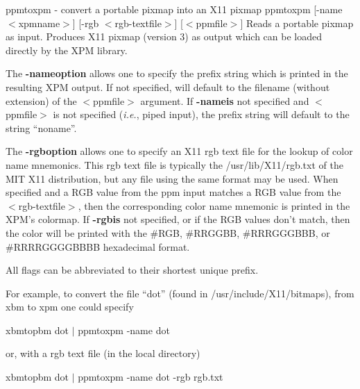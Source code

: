 %

\newpage
%

ppmtoxpm - convert a portable pixmap into an X11 pixmap
ppmtoxpm [-name $<$xpmname$>$] [-rgb $<$rgb-textfile$>$] [$<$ppmfile$>$]
Reads a portable pixmap as input.
Produces X11 pixmap  (version 3) as output which
can be loaded directly by the XPM library.
\par
The {\bf -nameoption} allows one to specify the prefix string which is printed
in the resulting XPM output.  If not specified, will default to the
filename (without extension) of the $<$ppmfile$>$ argument.
If {\bf -nameis} not specified and $<$ppmfile$>$
is not specified ({\it i.e.}, piped input), the prefix string will default to
the string ``noname''.
\par
The {\bf -rgboption} allows one to specify an X11 rgb text file for the
lookup of color name mnemonics.  This rgb text file is typically the
/usr/lib/X11/rgb.txt of the MIT X11 distribution, but any file using the
same format may be used.  When specified and
a RGB value from the ppm input matches a RGB value from the $<$rgb-textfile$>$,
then the corresponding color name mnemonic is printed in the XPM's colormap.
If {\bf -rgbis} not specified, or if the RGB values don't match, then the color
will be printed with the \#RGB, \#RRGGBB, \#RRRGGGBBB, or \#RRRRGGGGBBBB
hexadecimal format.
\par
All flags can be abbreviated to their shortest unique prefix.
\par
For example, to convert the file ``dot'' (found in /usr/include/X11/bitmaps),
from xbm to xpm one could specify
\begin{IPlist}
\IPitem{{}}
xbmtopbm dot $|$ ppmtoxpm -name dot
\end{IPlist}

\par
or, with a rgb text file (in the local directory)
\begin{IPlist}
\IPitem{{}}
xbmtopbm dot $|$ ppmtoxpm -name dot -rgb rgb.txt
\end{IPlist}

